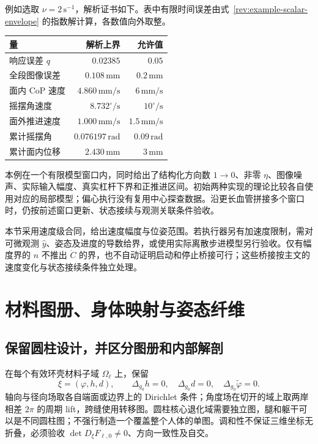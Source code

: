 \documentclass[11pt,a4paper]{article}
\numberwithin{equation}{section}
\theoremstyle{definition}
\begin{document}
例如选取 $\nu=2\,\mathrm{s}^{-1}$，解析证书如下。表中有限时间误差由式~\eqref{rev:example-scalar-envelope} 的指数解计算，各数值向外取整。
\begin{center}
\small
\begin{tabular}{lrr}
\toprule
量 & 解析上界 & 允许值\\
\midrule
响应误差 $q$ & $0.02385$ & $0.05$\\
全段图像误差 & $0.108\,\mathrm{mm}$ & $0.2\,\mathrm{mm}$\\
面内 CoP 速度 & $4.860\,\mathrm{mm/s}$ & $6\,\mathrm{mm/s}$\\
摇摆角速度 & $8.732^\circ/\mathrm{s}$ & $10^\circ/\mathrm{s}$\\
面外推进速度 & $1.000\,\mathrm{mm/s}$ & $1.5\,\mathrm{mm/s}$\\
累计摇摆角 & $0.076197\,\mathrm{rad}$ & $0.09\,\mathrm{rad}$\\
累计面内位移 & $2.430\,\mathrm{mm}$ & $3\,\mathrm{mm}$\\
\bottomrule
\end{tabular}
\end{center}

本例在一个有限模型窗口内，同时给出了结构化方向数 $1\to0$、非零 $\eta$、图像噪声、实际输入幅度、真实杠杆下界和正推进区间。初始两种实现的理论比较各自使用对应的局部模型；偏心执行没有复用中心探查数据。沿更长血管拼接多个窗口时，仍按前述窗口更新、状态接续与观测关联条件验收。

本节采用速度级合同，给出速度幅度与位姿范围。若执行器另有加速度限制，需对可微观测 $\widehat y$、姿态及进度的导数给界，或使用实际离散步进模型另行验收。仅有幅度界的 $n$ 不推出 $\dot C$ 的界，也不自动证明启动和停止桥接可行；这些桥接按主文的速度变化与状态接续条件独立处理。


\section{材料图册、身体映射与姿态纤维}\label{sec:rev:geometry}
\subsection{保留圆柱设计，并区分图册和内部解剖}
在每个有效环壳材料子域 $\Omega_\ell$ 上，保留
\begin{equation}
 \xi=(\varphi,h,d),\qquad
 \Delta_{g_0}h=0,\quad \Delta_{g_0}d=0,\quad
 \Delta_{g_0}\widetilde\varphi=0.
\end{equation}
轴向与径向场取各自端面或边界上的 Dirichlet 条件；角度场在切开的域上取两岸相差 $2\pi$ 的周期 lift，跨缝使用转移图。圆柱核心退化域需要独立图，腿和躯干可以是不同圆柱图；不强行制造一个覆盖整个人体的单图。调和性不保证三维坐标无折叠，必须验收 $\det D_\xi F_{\ell,0}\ne0$、方向一致性及自交。
\end{document}
